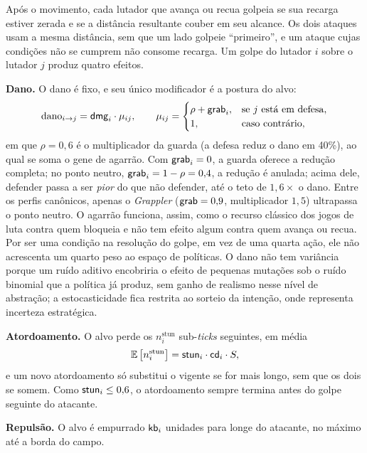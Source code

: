 Após o movimento, cada lutador que avança ou recua golpeia se sua recarga estiver zerada e se a distância resultante couber em seu alcance. Os dois ataques usam a mesma distância, sem que um lado golpeie ``primeiro'', e um ataque cujas condições não se cumprem não consome recarga. Um golpe do lutador $i$ sobre o lutador $j$ produz quatro efeitos.

\textbf{Dano.} O dano é fixo, e seu único modificador é a postura do alvo:
\begin{equation}
    \label{eq: dano}
    \mathrm{dano}_{i \to j} = \mathsf{dmg}_i \cdot \mu_{ij},
    \qquad
    \mu_{ij} =
    \begin{cases}
        \rho + \mathsf{grab}_i, & \text{se } j \text{ está em defesa},\\
        1, & \text{caso contrário},
    \end{cases}
\end{equation}
em que $\rho = 0{,}6$ é o multiplicador da guarda (a defesa reduz o dano em 40\%), ao qual se soma o gene de agarrão. Com $\mathsf{grab}_i = 0$, a guarda oferece a redução completa; no ponto neutro, $\mathsf{grab}_i = 1 - \rho = 0{,}4$, a redução é anulada; acima dele, defender passa a ser \textit{pior} do que não defender, até o teto de $1{,}6\times$ o dano. Entre os perfis canônicos, apenas o \textit{Grappler} ($\mathsf{grab} = 0{,}9$, multiplicador $1{,}5$) ultrapassa o ponto neutro. O agarrão funciona, assim, como o recurso clássico dos jogos de luta contra quem bloqueia e não tem efeito algum contra quem avança ou recua. Por ser uma condição na resolução do golpe, em vez de uma quarta ação, ele não acrescenta um quarto peso ao espaço de políticas. O dano não tem variância porque um ruído aditivo encobriria o efeito de pequenas mutações sob o ruído binomial que a política já produz, sem ganho de realismo nesse nível de abstração; a estocasticidade fica restrita ao sorteio da intenção, onde representa incerteza estratégica.

\textbf{Atordoamento.} O alvo perde os $n^{\mathrm{stun}}_i$ sub-\textit{ticks} seguintes, em média
\begin{equation}
    \label{eq: stun}
    \mathbb{E}\left[n^{\mathrm{stun}}_i\right] = \mathsf{stun}_i \cdot \mathsf{cd}_i \cdot S,
\end{equation}
e um novo atordoamento só substitui o vigente se for mais longo, sem que os dois se somem. Como $\mathsf{stun}_i \le 0{,}6$, o atordoamento sempre termina antes do golpe seguinte do atacante.

\textbf{Repulsão.} O alvo é empurrado $\mathsf{kb}_i$ unidades para longe do atacante, no máximo até a borda do campo.

